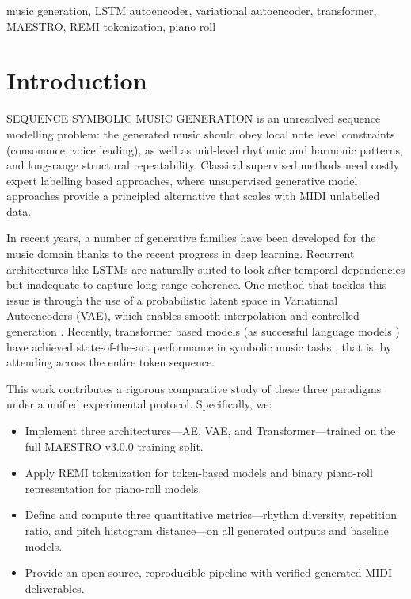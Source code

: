 \documentclass[conference]{IEEEtran}
\begin{document}
\begin{IEEEkeywords}
music generation, LSTM autoencoder, variational autoencoder, transformer, MAESTRO, REMI tokenization, piano-roll
\end{IEEEkeywords}

\section{Introduction}

SEQUENCE SYMBOLIC MUSIC GENERATION is an unresolved sequence modelling problem: the generated music should obey local note level constraints (consonance, voice leading), as well as mid-level rhythmic and harmonic patterns, and long-range structural repeatability. Classical supervised methods need costly expert labelling based approaches, where unsupervised generative model approaches provide a principled alternative that scales with MIDI unlabelled data.

In recent years, a number of generative families have been developed for the music domain thanks to the recent progress in deep learning. Recurrent architectures like LSTMs are naturally suited to look after temporal dependencies but inadequate to capture long-range coherence. One method that tackles this issue is through the use of a probabilistic latent space in Variational Autoencoders (VAE), which enables smooth interpolation and controlled generation \cite{vae}. Recently, transformer based models (as successful language models \cite{transformer}) have achieved state-of-the-art performance in symbolic music tasks \cite{musetransformer}, that is, by attending across the entire token sequence.

This work contributes a rigorous comparative study of these three paradigms under a unified experimental protocol. Specifically, we:
\begin{itemize}
    \item Implement three architectures—AE, VAE, and Transformer—trained on the full MAESTRO v3.0.0 training split.
    \item Apply REMI tokenization \cite{miditok} for token-based models and binary piano-roll representation for piano-roll models.
    \item Define and compute three quantitative metrics—rhythm diversity, repetition ratio, and pitch histogram distance—on all generated outputs and baseline models.
    \item Provide an open-source, reproducible pipeline with verified generated MIDI deliverables.
\end{itemize}
\end{document}
